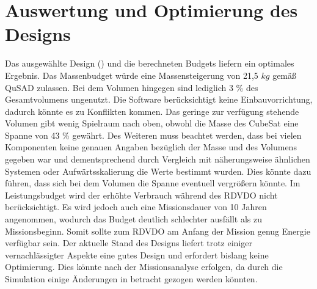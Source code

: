 			\section{Auswertung und Optimierung des Designs}
			Das ausgewählte Design () und die berechneten Budgets liefern ein optimales Ergebnis. Das Massenbudget würde eine Massensteigerung von 21,5 $kg$ gemäß QuSAD zulassen. Bei dem Volumen hingegen sind lediglich 3 \% des Gesamtvolumens ungenutzt. Die Software berücksichtigt keine Einbauvorrichtung, dadurch könnte es zu Konflikten kommen. Das geringe zur verfügung stehende Volumen gibt wenig Spielraum nach oben, obwohl die Masse des CubeSat eine Spanne von 43 \% gewährt. Des Weiteren muss beachtet werden, dass bei vielen Komponenten keine genauen Angaben bezüglich der Masse und des Volumens gegeben war und dementsprechend durch Vergleich mit näherungsweise ähnlichen Systemen oder Aufwärtsskalierung die Werte bestimmt wurden. Dies könnte dazu führen, dass sich bei dem Volumen die Spanne eventuell vergrößern könnte. Im Leistungsbudget wird der erhöhte Verbrauch während des RDVDO nicht berücksichtigt. Es wird jedoch auch eine Missionsdauer von 10 Jahren angenommen, wodurch das Budget deutlich schlechter ausfällt als zu Missionsbeginn. Somit sollte zum RDVDO am Anfang der Mission genug Energie verfügbar sein. Der aktuelle Stand des Designs liefert trotz einiger vernachlässigter Aspekte eine gutes Design und erfordert bislang keine Optimierung. Dies könnte nach der Missionsanalyse erfolgen, da durch die Simulation   einige Änderungen in betracht gezogen werden könnten. 
				
